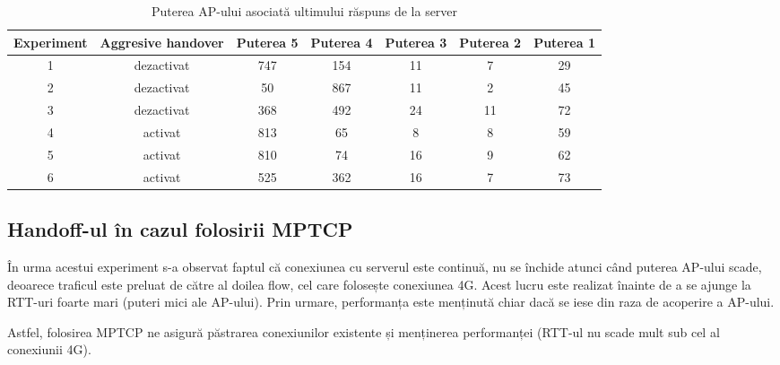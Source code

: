 \begin{table}[h!]
\centering
\caption{Puterea AP-ului asociată ultimului răspuns de la server}
\label{tab:putere}
\begin{tabular}{c | c | c | c | c | c | c}
\hline
Experiment & Aggresive handover& Puterea 5 & Puterea 4 & Puterea 3 & Puterea 2 & Puterea 1 \\
\hline
1 & dezactivat & 747 & 154 & 11 & 7 & 29 \\
2 & dezactivat & 50 & 867 & 11 & 2 & 45 \\
3 & dezactivat & 368 & 492 & 24 & 11 & 72 \\
4 & activat  & 813 & 65 & 8 & 8 & 59 \\
5 & activat  & 810 & 74 & 16 & 9 & 62 \\
6 & activat  & 525 & 362 & 16 & 7 & 73 \\
\hline
\end{tabular}
\end{table}

\subsection{Handoff-ul în cazul folosirii MPTCP}

În urma acestui experiment s-a observat faptul că conexiunea cu serverul este continuă, nu se închide atunci când puterea AP-ului scade, deoarece traficul este preluat de către al doilea flow, cel care folosește conexiunea 4G. Acest lucru este realizat înainte de a se ajunge la RTT-uri foarte mari (puteri mici ale AP-ului). Prin urmare, performanța este menținută chiar dacă se iese din raza de acoperire a AP-ului.

Astfel, folosirea MPTCP ne asigură păstrarea conexiunilor existente și menținerea performanței (RTT-ul nu scade mult sub cel al conexiunii 4G).
